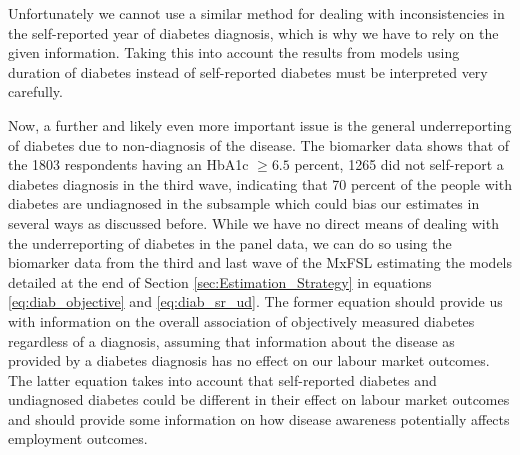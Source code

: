 Unfortunately we cannot use a similar method for dealing with inconsistencies
in the self-reported year of diabetes diagnosis, which is why we have
to rely on the given information. Taking this into account the results
from models using duration of diabetes instead of self-reported diabetes
must be interpreted very carefully.

Now, a further and likely even more important issue is the general underreporting of diabetes due to non-diagnosis of the disease. The biomarker data shows that of the 1803 respondents having an \ac{HbA1c} $\geq6.5$ percent, 1265 did
not self-report a diabetes diagnosis in the third wave, indicating
that 70 percent of the people with diabetes are undiagnosed in the
subsample which could bias our estimates in several ways as discussed before.
While we have no direct means of dealing with the underreporting of diabetes in the panel data, we can do so using the biomarker data from the third and last wave of the \ac{MxFSL} estimating the models detailed at the end of Section \ref{sec:Estimation_Strategy} in equations \ref{eq:diab_objective} and \ref{eq:diab_sr_ud}. The former equation should provide us with information on the overall association of objectively measured diabetes regardless of a diagnosis, assuming that information about the disease as provided by a diabetes diagnosis has no effect on our labour market outcomes. The latter equation takes into account that self-reported diabetes and undiagnosed diabetes could be different in their effect on labour market outcomes and should provide some information on how disease awareness potentially affects employment outcomes.

  
  
  
  
  